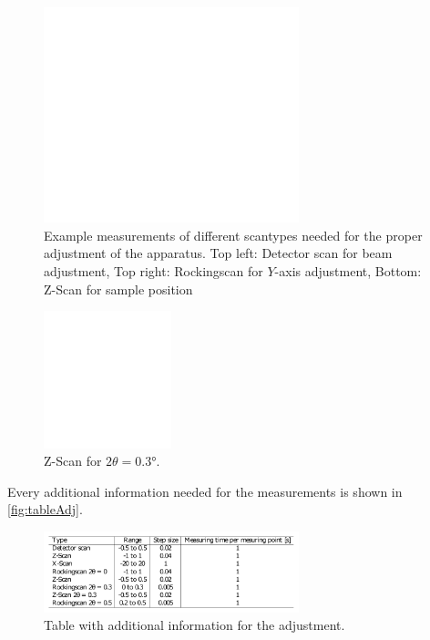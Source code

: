 \begin{figure}
	\centering
	\includegraphics[width=0.66\textwidth]{content/graphics/AdjustmentPlots.pdf}
	\caption{Example measurements of different scantypes needed for the proper adjustment of the apparatus. Top left: Detector scan for beam adjustment, Top right: Rockingscan for $Y$-axis adjustment, Bottom: Z-Scan for sample position }
	\label{fig:Adjustplot}
\end{figure}

\begin{figure}
	\centering
	\includegraphics[width=0.33\textwidth]{content/graphics/zscan.pdf}
	\caption{Z-Scan for $2\theta = 0.3°$.}
	\label{fig:zscan}
\end{figure}

Every additional information needed for the measurements is shown in \autoref{fig:tableAdj}.
\begin{figure}
	\centering
	\includegraphics[width=0.66\textwidth]{content/graphics/table.pdf}
	\caption{Table with additional information for the adjustment.}
	\label{fig:tableAdj}
\end{figure}

